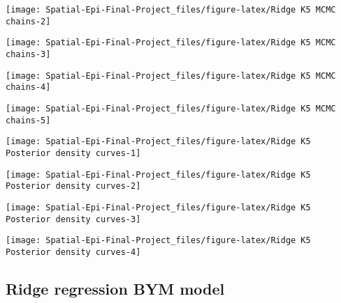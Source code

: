 \documentclass[]{article}
\begin{document}
\begin{center}\texttt{[image: Spatial-Epi-Final-Project\_files/figure-latex/Ridge K5 MCMC chains-2]} \end{center}

\begin{center}\texttt{[image: Spatial-Epi-Final-Project\_files/figure-latex/Ridge K5 MCMC chains-3]} \end{center}

\begin{center}\texttt{[image: Spatial-Epi-Final-Project\_files/figure-latex/Ridge K5 MCMC chains-4]} \end{center}

\begin{center}\texttt{[image: Spatial-Epi-Final-Project\_files/figure-latex/Ridge K5 MCMC chains-5]} \end{center}

\begin{center}\texttt{[image: Spatial-Epi-Final-Project\_files/figure-latex/Ridge K5 Posterior density curves-1]} \end{center}

\begin{center}\texttt{[image: Spatial-Epi-Final-Project\_files/figure-latex/Ridge K5 Posterior density curves-2]} \end{center}

\begin{center}\texttt{[image: Spatial-Epi-Final-Project\_files/figure-latex/Ridge K5 Posterior density curves-3]} \end{center}

\begin{center}\texttt{[image: Spatial-Epi-Final-Project\_files/figure-latex/Ridge K5 Posterior density curves-4]} \end{center}

\hypertarget{ridge-regression-bym-model}{%
\subsection{Ridge regression BYM
model}\label{ridge-regression-bym-model}}
\end{document}
